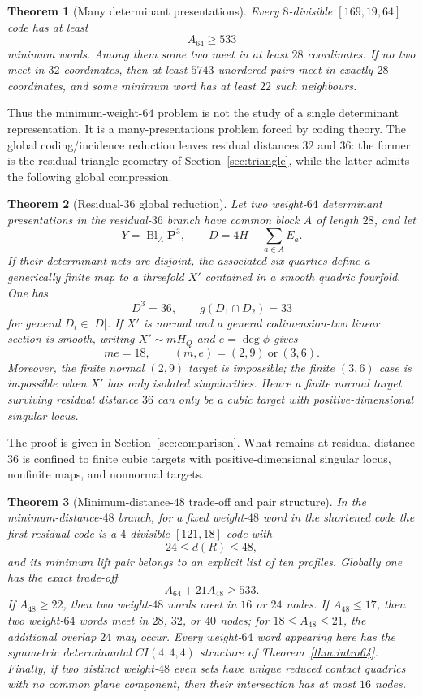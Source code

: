 \documentclass[11pt,reqno]{amsart}
\newtheorem{theorem}{Theorem}[section]
\theoremstyle{remark}
\newcommand{\PP}{\mathbf P}
\begin{document}
\begin{theorem}[Many determinant presentations]\label{thm:intro-many}
Every $8$-divisible $[169,19,64]$ code has at least
\[
A_{64}\ge533
\]
minimum words.  Among them some two meet in at least $28$ coordinates.  If no two meet in $32$ coordinates, then at least $5743$ unordered pairs meet in exactly $28$ coordinates, and some minimum word has at least $22$ such neighbours.
\end{theorem}

Thus the minimum-weight-$64$ problem is not the study of a single determinant representation.  It is a many-presentations problem forced by coding theory.  The global coding/incidence reduction leaves residual distances $32$ and $36$: the former is the residual-triangle geometry of Section~\ref{sec:triangle}, while the latter admits the following global compression.

\begin{theorem}[Residual-$36$ global reduction]\label{thm:intro36}
Let two weight-$64$ determinant presentations in the residual-$36$ branch have common block $A$ of length $28$, and let
\[
Y=\operatorname{Bl}_A\PP^3,
\qquad
D=4H-\sum_{a\in A}E_a.
\]
If their determinant nets are disjoint, the associated six quartics define a generically finite map to a threefold $X'$ contained in a smooth quadric fourfold.  One has
\[
D^3=36,
\qquad
g(D_1\cap D_2)=33
\]
for general $D_i\in|D|$.  If $X'$ is normal and a general codimension-two linear section is smooth, writing $X'\sim mH_Q$ and $e=\deg\phi$ gives
\[
me=18,
\qquad
(m,e)=(2,9)\ \text{or}\ (3,6).
\]
Moreover, the finite normal $(2,9)$ target is impossible; the finite $(3,6)$ case is impossible when $X'$ has only isolated singularities.  Hence a finite normal target surviving residual distance $36$ can only be a cubic target with positive-dimensional singular locus.
\end{theorem}

The proof is given in Section~\ref{sec:comparison}.  What remains at residual distance $36$ is confined to finite cubic targets with positive-dimensional singular locus, nonfinite maps, and nonnormal targets.

\begin{theorem}[Minimum-distance-$48$ trade-off and pair structure]\label{thm:intro48}
In the minimum-distance-$48$ branch, for a fixed weight-$48$ word in the shortened code the first residual code is a $4$-divisible $[121,18]$ code with
\[
24\le d(R)\le48,
\]
and its minimum lift pair belongs to an explicit list of ten profiles.  Globally one has the exact trade-off
\[
A_{64}+21A_{48}\ge533.
\]
If $A_{48}\ge22$, then two weight-$48$ words meet in $16$ or $24$ nodes.  If $A_{48}\le17$, then two weight-$64$ words meet in $28$, $32$, or $40$ nodes; for $18\le A_{48}\le21$, the additional overlap $24$ may occur.  Every weight-$64$ word appearing here has the symmetric determinantal $CI(4,4,4)$ structure of Theorem~\ref{thm:intro64}.  Finally, if two distinct weight-$48$ even sets have unique reduced contact quadrics with no common plane component, then their intersection has at most $16$ nodes.
\end{theorem}
\end{document}
